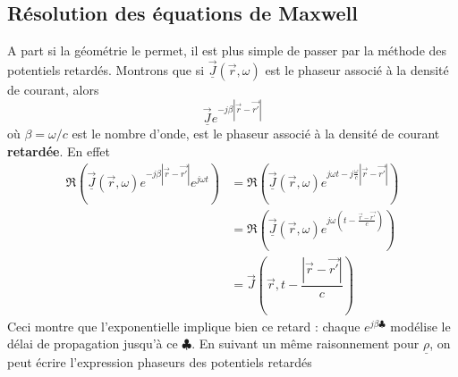 	\subsection{Résolution des équations de Maxwell}
	A part si la géométrie le permet, il est plus simple de passer par la méthode des potentiels 
	retardés. Montrons que si $\underline{\vec{J}}(\vec{r},\omega)$ est le phaseur associé à la 
	densité de courant, alors
	\begin{equation}
	\underline{\vec{J}}e^{-j\beta|\vec{r}-\vec{r'}|}
	\end{equation}
	où $\beta = \omega/c$ est le nombre d'onde, est le phaseur associé à la densité de courant 
	\textbf{retardée}. En effet
	\begin{equation}
	\begin{array}{ll}
	\Re\left(\underline{\vec{J}}(\vec{r},\omega)e^{-j\beta|\vec{r}-\vec{r'}|}e^{j\omega t}\right) &=
	\Re\left(\underline{\vec{J}}(\vec{r},\omega)e^{j\omega t - j\frac{\omega}{c}	|\vec{r}-\vec{r'}|}
	\right)	 \\
	&=\Re \left(\underline{\vec{J}}(\vec{r},\omega)e^{j\omega\left(t-\frac{\vec{r}-\vec{r'}}{c}\right)}
	\right)\\
	&= \vec{J}\left(\vec{r},t-\dfrac{|\vec{r}-\vec{r'}|}{c}\right)
	\end{array}
	\end{equation}
	Ceci montre que l'exponentielle implique bien ce retard : chaque $e^{j\beta\clubsuit}$ modélise 
	le délai de propagation jusqu'à ce $\clubsuit$. En suivant un même raisonnement pour $\underline{
	\rho}$,  on peut écrire l'expression phaseurs des potentiels retardés\\
	

